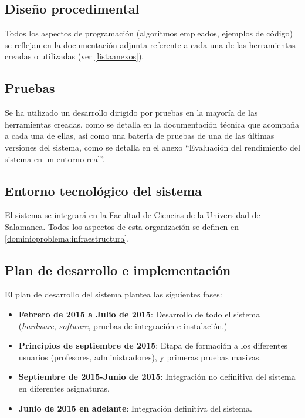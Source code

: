 \subsection{Diseño procedimental}

Todos los aspectos de programación (algoritmos empleados, ejemplos de código) se reflejan en la documentación adjunta referente a cada una de las herramientas creadas o utilizadas (ver \ref{listaanexos}).

\subsection{Pruebas}

Se ha utilizado un desarrollo dirigido por pruebas en la mayoría de las herramientas creadas, como se detalla en la documentación técnica que acompaña a cada una de ellas, así como una batería de pruebas de una de las últimas versiones del sistema, como se detalla en el anexo ``Evaluación del rendimiento del sistema en un entorno real''.

\subsection{Entorno tecnológico del sistema}

El sistema se integrará en la Facultad de Ciencias de la Universidad de Salamanca. Todos los aspectos de esta organización se definen en \ref{dominioproblema:infraestructura}.

\subsection{Plan de desarrollo e implementación}

El plan de desarrollo del sistema plantea las siguientes fases:

\begin{itemize}
\item \textbf{Febrero de 2015 a Julio de 2015}: Desarrollo de todo el sistema (\textit{hardware}, \textit{software}, pruebas de integración e instalación.)
\item \textbf{Principios de septiembre de 2015}: Etapa de formación a los diferentes usuarios (profesores, administradores), y primeras pruebas masivas.
\item \textbf{Septiembre de 2015-Junio de 2015}: Integración no definitiva del sistema en diferentes asignaturas.
\item \textbf{Junio de 2015 en adelante}: Integración definitiva del sistema.
\end{itemize}

